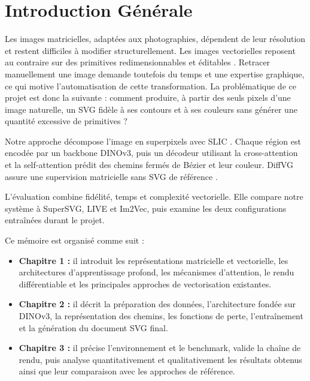 \documentclass[12pt, a4paper, oneside]{report}
\begin{document}
\chapter*{Introduction Générale}

Les images matricielles, adaptées aux photographies, dépendent de leur résolution et restent
difficiles à modifier structurellement. Les images vectorielles reposent au contraire sur des
primitives redimensionnables et éditables \cite{gonzalez2018digital,foley1996computer}.
Retracer manuellement une image demande toutefois du temps et une expertise graphique, ce
qui motive l'automatisation de cette transformation. La problématique de ce projet est donc la
suivante : comment produire, à partir des seuls pixels d'une image naturelle, un SVG fidèle à
ses contours et à ses couleurs sans générer une quantité excessive de primitives ?

Notre approche décompose l'image en superpixels avec SLIC \cite{achanta2012slic}. Chaque
région est encodée par un backbone DINOv3, puis un décodeur utilisant la cross-attention et la
self-attention prédit des chemins fermés de Bézier et leur couleur. DiffVG assure une
supervision matricielle sans SVG de référence \cite{li2020diffvg,simeoni2025dinov3}.

L'évaluation combine fidélité, temps et complexité vectorielle. Elle compare notre système à
SuperSVG, LIVE et Im2Vec, puis examine les deux configurations entraînées durant le projet.

\bigskip
Ce mémoire est organisé comme suit :
\begin{itemize}
  \item \textbf{Chapitre 1 :} il introduit les représentations matricielle et vectorielle,
        les architectures d'apprentissage profond, les mécanismes d'attention, le rendu
        différentiable et les principales approches de vectorisation existantes.
  \item \textbf{Chapitre 2 :} il décrit la préparation des données, l'architecture fondée
        sur DINOv3, la représentation des chemins, les fonctions de perte, l'entraînement et
        la génération du document SVG final.
  \item \textbf{Chapitre 3 :} il précise l'environnement et le benchmark, valide la chaîne
        de rendu, puis analyse quantitativement et qualitativement les résultats obtenus ainsi
        que leur comparaison avec les approches de référence.
\end{itemize}
\end{document}
